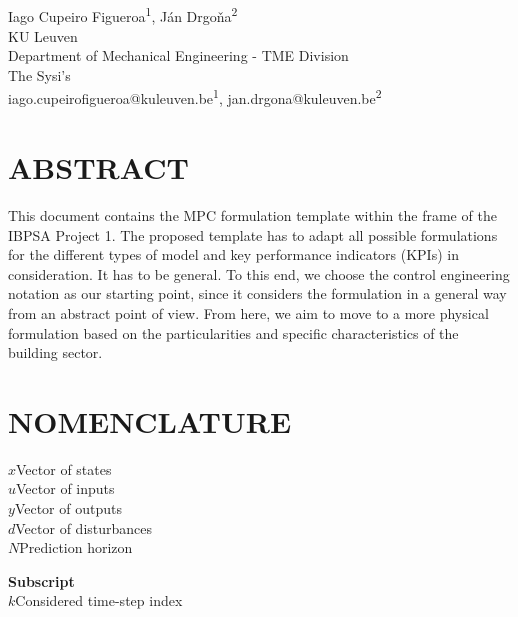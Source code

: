 \documentclass[10pt]{extarticle}
\begin{document}
	
\begin{center}
\vspace{0.2in}
\\[14pt]

{\fontsize{11pt}{1.2em}\selectfont
Iago Cupeiro Figueroa\textsuperscript{1}, J\'an Drgo\v na\textsuperscript{2}
\\[11pt]

KU Leuven\\
Department of Mechanical Engineering - TME Division\\
The Sysi's \\[11pt]

iago.cupeirofigueroa@kuleuven.be\textsuperscript{1}, jan.drgona@kuleuven.be\textsuperscript{2} \\
}
\end{center}

\vspace{0.5cm}


\section*{ABSTRACT}

This document contains the MPC formulation template within the frame of the IBPSA Project 1.
The proposed template has to adapt all possible formulations for the different types of model and key performance indicators (KPIs) in consideration.
It has to be general.
To this end, we choose the control engineering notation as our starting point,
since it considers the formulation in a general way from an abstract point of view.
From here, we aim to move to a more physical formulation based on the particularities and specific characteristics of the building sector.

\section*{NOMENCLATURE}

\begin{samepage}
	$x$\tabto{1.0in}Vector of states	\\
	$u$\tabto{1.0in}Vector of inputs	\\
	$y$\tabto{1.0in}Vector of outputs\\	
	$d$\tabto{1.0in}Vector of disturbances\ \\
	$N$\tabto{1.0in}Prediction horizon
	
\end{samepage}
\begin{samepage}
	\textbf{Subscript}\\
	$k$\tabto{1.0in}Considered time-step index
\end{samepage}
\end{document}
